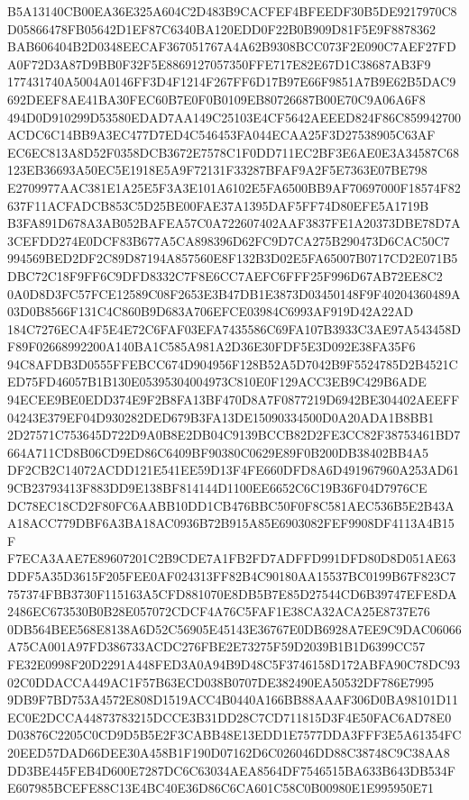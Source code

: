 \documentclass[UTF8,fontset=fandol,zihao=-4,a4paper]{ctexart}
\begin{document}
{{B5A13140CB00EA36E325A604C2D483B9CACFEF4BFEEDF30B5DE9217970C8D05866478FB05642D1EF87C6340BA120EDD0F22B0B909D81F5E9F8878362
BAB606404B2D0348EECAF367051767A4A62B9308BCC073F2E090C7AEF27FDA0F72D3A87D9BB0F32F5E8869127057350FFE717E82E67D1C38687AB3F9
177431740A5004A0146FF3D4F1214F267FF6D17B97E66F9851A7B9E62B5DAC9692DEEF8AE41BA30FEC60B7E0F0B0109EB80726687B00E70C9A06A6F8
494D0D910299D53580EDAD7AA149C25103E4CF5642AEEED824F86C859942700ACDC6C14BB9A3EC477D7ED4C546453FA044ECAA25F3D27538905C63AF
EC6EC813A8D52F0358DCB3672E7578C1F0DD711EC2BF3E6AE0E3A34587C68123EB36693A50EC5E1918E5A9F72131F33287BFAF9A2F5E7363E07BE798
E2709977AAC381E1A25E5F3A3E101A6102E5FA6500BB9AF70697000F18574F82637F11ACFADCB853C5D25BE00FAE37A1395DAF5FF74D80EFE5A1719B
B3FA891D678A3AB052BAFEA57C0A722607402AAF3837FE1A20373DBE78D7A3CEFDD274E0DCF83B677A5CA898396D62FC9D7CA275B290473D6CAC50C7
994569BED2DF2C89D87194A857560E8F132B3D02E5FA65007B0717CD2E071B5DBC72C18F9FF6C9DFD8332C7F8E6CC7AEFC6FFF25F996D67AB72EE8C2
0A0D8D3FC57FCE12589C08F2653E3B47DB1E3873D03450148F9F40204360489A03D0B8566F131C4C860B9D683A706EFCE03984C6993AF919D42A22AD
184C7276ECA4F5E4E72C6FAF03EFA7435586C69FA107B3933C3AE97A543458DF89F02668992200A140BA1C585A981A2D36E30FDF5E3D092E38FA35F6
94C8AFDB3D0555FFEBCC674D904956F128B52A5D7042B9F5524785D2B4521CED75FD46057B1B130E05395304004973C810E0F129ACC3EB9C429B6ADE
94ECEE9BE0EDD374E9F2B8FA13BF470D8A7F0877219D6942BE304402AEEFF04243E379EF04D930282DED679B3FA13DE15090334500D0A20ADA1B8BB1
2D27571C753645D722D9A0B8E2DB04C9139BCCB82D2FE3CC82F38753461BD7664A711CD8B06CD9ED86C6409BF90380C0629E89F0B200DB38402BB4A5
DF2CB2C14072ACDD121E541EE59D13F4FE660DFD8A6D491967960A253AD619CB23793413F883DD9E138BF814144D1100EE6652C6C19B36F04D7976CE
DC78EC18CD2F80FC6AABB10DD1CB476BBC50F0F8C581AEC536B5E2B43AA18ACC779DBF6A3BA18AC0936B72B915A85E6903082FEF9908DF4113A4B15F
F7ECA3AAE7E89607201C2B9CDE7A1FB2FD7ADFFD991DFD80D8D051AE63DDF5A35D3615F205FEE0AF024313FF82B4C90180AA15537BC0199B67F823C7
757374FBB3730F115163A5CFD881070E8DB5B7E85D27544CD6B39747EFE8DA2486EC673530B0B28E057072CDCF4A76C5FAF1E38CA32ACA25E8737E76
0DB564BEE568E8138A6D52C56905E45143E36767E0DB6928A7EE9C9DAC06066A75CA001A97FD386733ACDC276FBE2E73275F59D2039B1B1D6399CC57
FE32E0998F20D2291A448FED3A0A94B9D48C5F3746158D172ABFA90C78DC9302C0DDACCA449AC1F57B63ECD038B0707DE382490EA50532DF786E7995
9DB9F7BD753A4572E808D1519ACC4B0440A166BB88AAAF306D0BA98101D11EC0E2DCCA44873783215DCCE3B31DD28C7CD711815D3F4E50FAC6AD78E0
D03876C2205C0CD9D5B5E2F3CABB48E13EDD1E7577DDA3FFF3E5A61354FC20EED57DAD66DEE30A458B1F190D07162D6C026046DD88C38748C9C38AA8
DD3BE445FEB4D600E7287DC6C63034AEA8564DF7546515BA633B643DB534FE607985BCEFE88C13E4BC40E36D86C6CA601C58C0B00980E1E995950E71
}}
\end{document}
